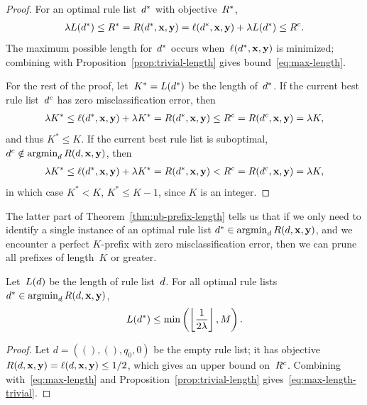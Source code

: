 \begin{proof}
For an optimal rule list~$d^*$ with objective~$R^*$,
\begin{align}
\Reg L(\OptimalRL) \le \OptimalObj = \Obj(\OptimalRL, \x, \y)
= \Loss(\OptimalRL, \x, \y) + \Reg L(\OptimalRL)
\le \CurrentObj.
\end{align}
The maximum possible length for~$d^*$ occurs
when~$\ell(d^*, \mathbf{x}, \mathbf{y})$ is minimized;
combining with Proposition~\ref{prop:trivial-length}
gives bound~\eqref{eq:max-length}.

For the rest of the proof,
let~${K^* = L(d^*)}$ be the length of~$d^*$.
%
If the current best rule list~$d^c$ has zero
misclassification error, then
\begin{align}
\Reg K^* \leq \Loss(\OptimalRL, \x, \y) + \Reg K^* = \Obj(\OptimalRL, \x, \y)
\le \CurrentObj = \Obj(\CurrentRL, \x, \y) = \Reg K,
\end{align}
and thus ${K^* \leq K}$.
%
If the current best rule list is suboptimal,
\ie ${d^c \notin \operatorname*{argmin}_{d} R({d}, \mathbf{x}, \mathbf{y})}$, then
%
\begin{align}
\Reg K^* \leq \Loss(\OptimalRL, \x, \y) + \Reg K^* = \Obj(\OptimalRL, \x, \y)
< \CurrentObj = \Obj(\CurrentRL, \x, \y) = \Reg K,
\end{align}
in which case ${K^* < K}$, \ie ${K^* \leq K-1}$, since $K$ is an integer.
\end{proof}

The latter part of Theorem~\ref{thm:ub-prefix-length} tells us that
if we only need to identify a single instance of an optimal rule list
${d^* \in \operatorname*{argmin}_{d} R({d}, \mathbf{x}, \mathbf{y})}$, and we encounter a perfect
$K$-prefix with zero misclassification error, then we can prune all
prefixes of length~$K$ or greater.

\begin{corollary}
\label{cor:ub-prefix-length}
Let~$L({d})$ be the length of rule list~${d}$.
%
For all optimal rule lists ${d^* \in \operatorname*{argmin}_{d} R({d}, \mathbf{x}, \mathbf{y})}$,
\begin{align}
L(\OptimalRL) \le \min \left( \left\lfloor \frac{1}{2\Reg} \right\rfloor, M \right).
\label{eq:max-length-trivial}
\end{align}
\end{corollary}

\begin{proof}
Let ${d = ((), (), q_0, 0)}$ be the empty rule list;
it has objective ${R({d}, \mathbf{x}, \mathbf{y}) = \ell({d}, \mathbf{x}, \mathbf{y}) \le 1/2}$,
which gives an upper bound on~${R^c}$.
%
Combining with~\eqref{eq:max-length}
and Proposition~\ref{prop:trivial-length}
gives~\eqref{eq:max-length-trivial}.
\end{proof}

